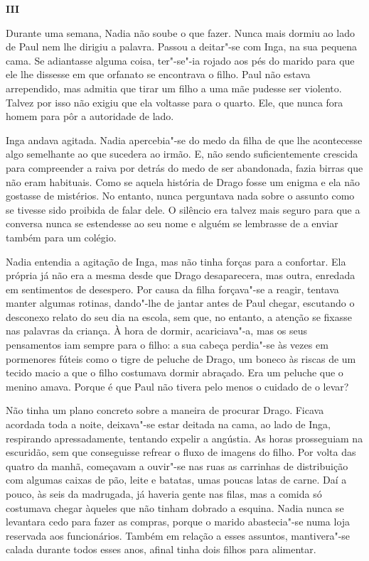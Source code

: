 \pagebreak
\thispagestyle{empty}
\movetooddpage
\vspace*{1.8cm}
\noindent{}\textbf{III}

\bigskip

\noindent{}Durante uma semana, Nadia não soube o que fazer. Nunca mais dormiu ao
lado de Paul nem lhe dirigiu a palavra. Passou a deitar"-se com Inga, na
sua pequena cama. Se adiantasse alguma coisa, ter"-se"-ia rojado aos pés
do marido para que ele lhe dissesse em que orfanato se encontrava o
filho. Paul não estava arrependido, mas admitia que tirar um filho a uma
mãe pudesse ser violento. Talvez por isso não exigiu que ela voltasse
para o quarto. Ele, que nunca fora homem para pôr a autoridade de lado.

Inga andava agitada. Nadia apercebia"-se do medo da filha de que lhe
acontecesse algo semelhante ao que sucedera ao irmão. E, não sendo
suficientemente crescida para compreender a raiva por detrás do medo de
ser abandonada, fazia birras que não eram habituais. Como se aquela
história de Drago fosse um enigma e ela não gostasse de mistérios. No
entanto, nunca perguntava nada sobre o assunto como se tivesse sido
proibida de falar dele. O silêncio era talvez mais seguro para que a
conversa nunca se estendesse ao seu nome e alguém se lembrasse de a
enviar também para um colégio.

Nadia entendia a agitação de Inga, mas não tinha forças para a
confortar. Ela própria já não era a mesma desde que Drago desaparecera,
mas outra, enredada em sentimentos de desespero. Por causa da filha
forçava"-se a reagir, tentava manter algumas rotinas, dando"-lhe de jantar
antes de Paul chegar, escutando o desconexo relato do seu dia na escola,
sem que, no entanto, a atenção se fixasse nas palavras da criança. À
hora de dormir, acariciava"-a, mas os seus pensamentos iam sempre para
o filho: a sua cabeça perdia"-se às vezes em pormenores fúteis como o
tigre de peluche de Drago, um boneco às riscas de um tecido macio a que
o filho costumava dormir abraçado. Era um peluche que o menino amava.
Porque é que Paul não tivera pelo menos o cuidado de o levar? %

Não tinha um plano concreto sobre a maneira de procurar Drago. Ficava acordada toda a noite, deixava"-se estar deitada na
cama, ao lado de Inga, respirando apressadamente, tentando expelir a
angústia. As horas prosseguiam na escuridão, sem que conseguisse
refrear o fluxo de imagens do filho. Por volta das quatro da manhã,
começavam a ouvir"-se nas ruas as carrinhas de distribuição com algumas
caixas de pão, leite e batatas, umas poucas latas de carne. Daí a pouco,
às seis da madrugada, já haveria gente nas filas, mas a comida só
costumava chegar àqueles que não tinham dobrado a esquina. Nadia nunca
se levantara cedo para fazer as compras, porque o marido abastecia"-se
numa loja reservada aos funcionários. Também em relação a esses
assuntos, mantivera"-se calada durante todos esses anos, afinal tinha
dois filhos para alimentar.

